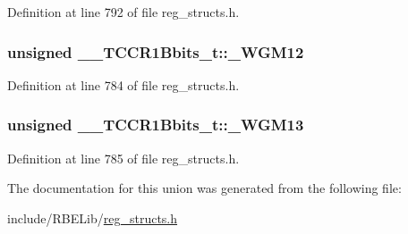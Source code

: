 Definition at line 792 of file reg\+\_\+structs.\+h.

\hypertarget{union_____t_c_c_r1_bbits__t_a69625c7e864a6bdbb5e3b62102d4fc2b}{
\subsubsection[{\+\_\+\+W\+G\+M12}]{\setlength{\rightskip}{0pt plus 5cm}unsigned \+\_\+\+\_\+\+T\+C\+C\+R1\+Bbits\+\_\+t\+::\+\_\+\+W\+G\+M12}}\label{union_____t_c_c_r1_bbits__t_a69625c7e864a6bdbb5e3b62102d4fc2b}


Definition at line 784 of file reg\+\_\+structs.\+h.

\hypertarget{union_____t_c_c_r1_bbits__t_a12ffd3cc7eac0319c442e4c8f81047ac}{
\subsubsection[{\+\_\+\+W\+G\+M13}]{\setlength{\rightskip}{0pt plus 5cm}unsigned \+\_\+\+\_\+\+T\+C\+C\+R1\+Bbits\+\_\+t\+::\+\_\+\+W\+G\+M13}}\label{union_____t_c_c_r1_bbits__t_a12ffd3cc7eac0319c442e4c8f81047ac}


Definition at line 785 of file reg\+\_\+structs.\+h.



The documentation for this union was generated from the following file\+:\begin{DoxyCompactItemize}
\item 
include/\+R\+B\+E\+Lib/\hyperlink{reg__structs_8h}{reg\+\_\+structs.\+h}\end{DoxyCompactItemize}
